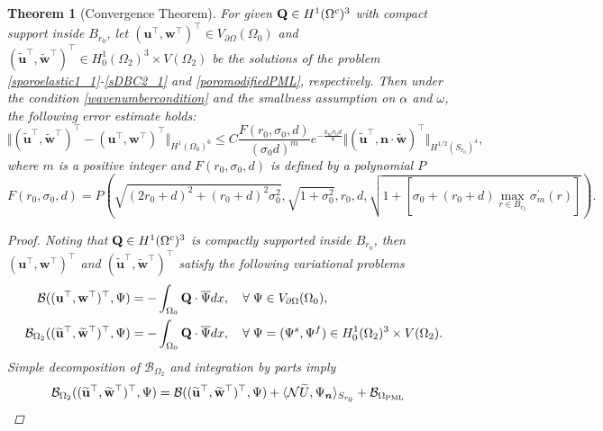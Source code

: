 \documentclass[11pt]{article}
\newcommand{\pa}{\partial}
\newcommand{\ov}{\overline}
\newcommand{\Om}{\Omega}
\newcommand{\sig}{\sigma}
\newcommand{\wid}{\widetilde}
\newcommand{\bs}{\boldsymbol}
\newcommand{\PML}{{\rm PML}}
\newtheorem{theorem}{Theorem}[section]
\begin{document}
\begin{theorem}[Convergence Theorem] For given 
${\bf Q} \in H^1(\Om^c)^3$ with compact support inside $B_{r_0}$, let $(\mathbf{u}^{\top},
\mathbf{w}^{\top})^{\top}\in V_{\pa\Om}(\Om_0)$ and $(\wid{\mathbf{u}}^{\top},
\wid{\mathbf{w}}^{\top})^{\top}\in H_0^1(\Om_2)^3\times V(\Om_2)$ be the solutions of the 
problem \eqref{sporoelastic1_1}-\eqref{sDBC2_1} and  \eqref{poromodifiedPML}, respectively. 
Then under the condition \eqref{wavenumbercondition} and the smallness assumption on $\alpha$ 
and $\omega$, the following error estimate holds:
\begin{equation}\label{porosolution_err}
\Vert (\wid{\mathbf{u}}^{\top},\wid{\mathbf{w}}^{\top})^{\top}-(\mathbf{u}^{\top},
\mathbf{w}^{\top})^{\top} \Vert_{H^1(\Om_0)^6} \leq  C\frac{F(r_0,\sig_0,d)}{(\sig_0d)^{m}}
e^{-\frac{k_m\sig_0d}{8}}\Vert (\wid{\mathbf{u}}^{\top},\bs{n}\cdot\wid{\mathbf{w}})^{\top} 
\Vert_{ H^{1/2}(S_{r_0})^4},
\end{equation}
where $m$ is a positive integer and $F(r_0,\sig_0,d)$ is defined by a polynomial $P$
\begin{equation*}
F(r_0,\sig_0,d)=P\left(\sqrt{(2r_0+d)^2+(r_0+d)^2\sig_0^2},\sqrt{1+\sig_0^2},r_0,d,
\sqrt{1+[\sig_0+(r_0+d)\max\limits_{r\in B_{r_2}}\sig_{m}^{'}(r)]}\right).
\end{equation*}
\begin{proof} 
Noting that ${\bf Q} \in H^1(\Om^c)^3$ is compactly supported inside $B_{r_0}$, then 
$(\mathbf{u}^{\top},\mathbf{w}^{\top})^{\top}$ and 
$(\wid{\mathbf{u}}^{\top},\wid{\mathbf{w}}^{\top})^{\top}$ satisfy the following variational problems
\begin{align}\label{scattering}
\mathcal{B}((\mathbf{u}^{\top},\mathbf{w}^{\top})^{\top},\Psi)&=-\int_{\Om_0}{\bf Q}\cdot \ov{\Psi}dx,
\quad \forall\;\Psi \in V_{\pa \Om}(\Om_0), \\ \label{pmlproblem}
\mathcal{B}_{\Om_2}((\wid{\mathbf{u}}^{\top},\wid{\mathbf{w}}^{\top})^{\top},\Psi)&
=-\int_{\Om_0}{\bf Q}\cdot \ov{\Psi}dx,
\quad \forall\;\Psi=(\Psi^s,\Psi^f)\in H_0^1(\Om_2)^3\times V(\Om_2).
\end{align}
Simple decomposition of $\mathcal{B}_{\Om_2}$ and integration by parts imply
\begin{equation}\label{B_decom}
\begin{aligned}
\mathcal{B}_{\Om_2}((\wid{\mathbf{u}}^{\top},\wid{\mathbf{w}}^{\top})^{\top},\Psi)
&= \mathcal{B}((\wid{\mathbf{u}}^{\top},\wid{\mathbf{w}}^{\top})^{\top},\Psi)+
\langle\mathcal{N}\wid{U},\Psi_{\bs{n}}\rangle_{S_{r_0}}+\mathcal{B}_{\Om_{\PML}}

\end{aligned}
\end{equation}
\end{proof}
\end{theorem}
\end{document}
